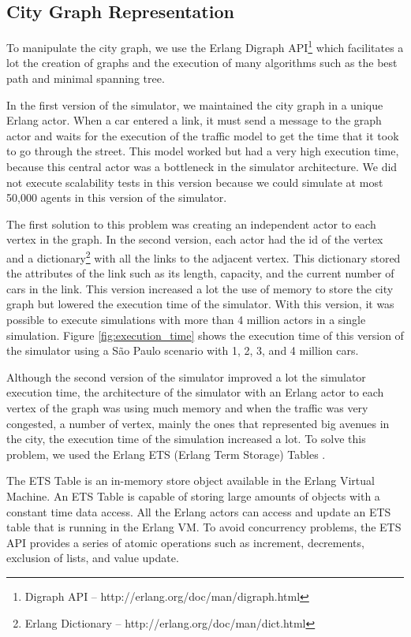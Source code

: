 \subsection{City Graph Representation}

To manipulate the city graph, we use the Erlang Digraph API\footnote{Digraph API -- http://erlang.org/doc/man/digraph.html} which facilitates a lot the creation of graphs and the execution of many algorithms such as the best path and minimal spanning tree.

In the first version of the simulator, we maintained the city graph in a unique Erlang actor. When a car entered a link, it must send a message to the graph actor and waits for the execution of the traffic model to get the time that it took to go through the street. This model worked but had a very high execution time, because this central actor was a bottleneck in the simulator architecture. We did not execute scalability tests in this version because we could simulate at most 50,000 agents in this version of the simulator.

The first solution to this problem was creating an independent actor to each vertex in the graph. In the second version, each actor had the id of the vertex and a dictionary\footnote{Erlang Dictionary -- http://erlang.org/doc/man/dict.html} with all the links to the adjacent vertex. This dictionary stored the attributes of the link such as its length, capacity, and the current number of cars in the link. This version increased a lot the use of memory to store the city graph but lowered the execution time of the simulator. With this version, it was possible to execute simulations with more than 4 million actors in a single simulation. Figure \ref{fig:execution_time} shows the execution time of this version of the simulator using a S\~ao Paulo scenario with 1, 2, 3, and 4 million cars.

Although the second version of the simulator improved a lot the simulator execution time, the architecture of the simulator with an Erlang actor to each vertex of the graph was using much memory and when the traffic was very congested, a number of vertex, mainly the ones that represented big avenues in the city, the execution time of the simulation increased a lot. To solve this problem, we used the Erlang ETS (Erlang Term Storage) Tables \citep{aronis2017shared}.

The ETS Table is an in-memory store object available in the Erlang Virtual Machine. An ETS Table is capable of storing large amounts of objects with a constant time data access. All the Erlang actors can access and update an ETS table that is running in the Erlang VM. To avoid concurrency problems, the ETS API provides a series of atomic operations such as increment, decrements, exclusion of lists, and value update.


